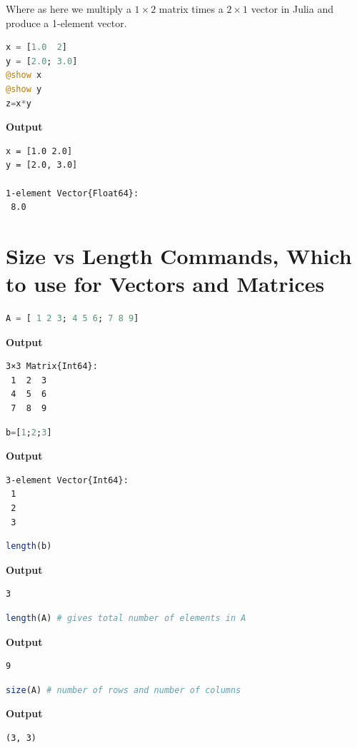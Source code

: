 Where as here we multiply a $1 \times 2$ matrix times a $2 \times 1$ vector in Julia and produce a 1-element vector.

\begin{lstlisting}[language=Julia,style=mystyle]
x = [1.0  2]
y = [2.0; 3.0]
@show x
@show y
z=x*y
\end{lstlisting}
\textbf{Output} 
\begin{verbatim}
x = [1.0 2.0]
y = [2.0, 3.0]

1-element Vector{Float64}:
 8.0
\end{verbatim}

\section{Size vs Length Commands, Which to use for Vectors and Matrices}

\begin{lstlisting}[language=Julia,style=mystyle]
A = [ 1 2 3; 4 5 6; 7 8 9]
\end{lstlisting}
\textbf{Output} 
\begin{verbatim}
3×3 Matrix{Int64}:
 1  2  3
 4  5  6
 7  8  9
\end{verbatim}

\begin{lstlisting}[language=Julia,style=mystyle]
b=[1;2;3]
\end{lstlisting}
\textbf{Output} 
\begin{verbatim}
3-element Vector{Int64}:
 1
 2
 3
\end{verbatim}

\begin{lstlisting}[language=Julia,style=mystyle]
length(b)
\end{lstlisting}
\textbf{Output} 
\begin{verbatim}
3
\end{verbatim}

\begin{lstlisting}[language=Julia,style=mystyle]
length(A) # gives total number of elements in A
\end{lstlisting}
\textbf{Output} 
\begin{verbatim}
9
\end{verbatim}

\begin{lstlisting}[language=Julia,style=mystyle]
size(A) # number of rows and number of columns
\end{lstlisting}
\textbf{Output} 
\begin{verbatim}
(3, 3)
\end{verbatim}

